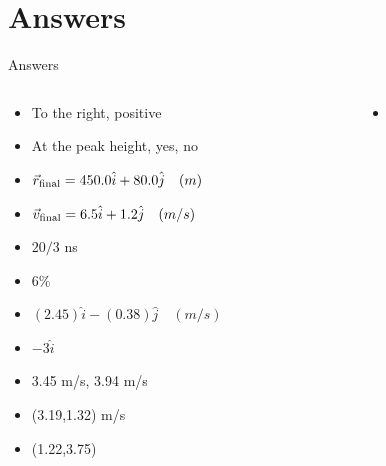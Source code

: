 \documentclass{beamer}
\begin{document}
\section{Answers}

\begin{frame}{Answers}
\begin{columns}[T]
\begin{column}{0.5\textwidth}
\begin{itemize}
\item To the right, positive
\item At the peak height, yes, no
\item $\vec{r}_{\rm final} = 450.0 \hat{i} + 80.0\hat{j}\quad (m)$
\item $\vec{v}_{\rm final} = 6.5 \hat{i} + 1.2\hat{j}\quad (m/s)$
\item $20/3$ ns
\item 6\%
\item $(2.45)\hat{i}-(0.38)\hat{j} \quad (m/s)$
\item $-3\hat{i}$
\item 3.45 m/s, 3.94 m/s
\item (3.19,1.32) m/s
\item (1.22,3.75)
\end{itemize}
\end{column}
\begin{column}{0.5\textwidth}
\begin{itemize}
\item 
\end{itemize}
\end{column}
\end{columns}
\end{frame}
\end{document}
